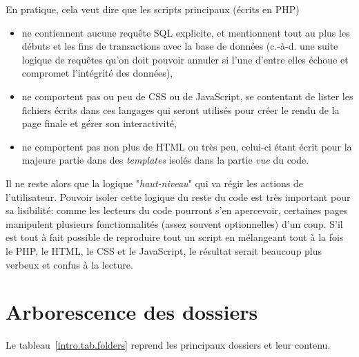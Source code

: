 En pratique, cela veut dire que les scripts principaux (écrits en PHP)
\begin{itemize}
\item ne contiennent aucune requête SQL explicite, et mentionnent tout au plus les débuts et les 
fins de transactions avec la base de données (c.-à-d. une suite logique de requêtes qu'on doit 
pouvoir annuler si l'une d'entre elles échoue et compromet l'intégrité des données), 
\item ne comportent pas ou peu de CSS ou de JavaScript, se contentant de lister les fichiers 
écrits dans ces langages qui seront utilisés pour créer le rendu de la page finale et gérer son 
interactivité, 
\item ne comportent pas non plus de HTML ou très peu, celui-ci étant écrit pour la majeure 
partie dans des \textit{templates} isolés dans la partie \textit{vue} du code.
\end{itemize}
\vspace{0.3cm}
Il ne reste alors que la logique "\textit{haut-niveau}" qui va régir les actions de l'utilisateur. 
Pouvoir isoler cette logique du reste du code est très important pour sa lisibilité: comme les 
lecteurs du code pourront s'en apercevoir, certaines pages manipulent plusieurs fonctionnalités 
(assez souvent optionnelles) d'un coup. S'il est tout à fait possible de reproduire tout un script 
en mélangeant tout à la fois le PHP, le HTML, le CSS et le JavaScript, le résultat serait beaucoup 
plus verbeux et confus à la lecture. %

\section{Arborescence des dossiers}\label{intro.folders}

Le tableau~\ref{intro.tab.folders} reprend les principaux dossiers et leur contenu.

\newpage %

